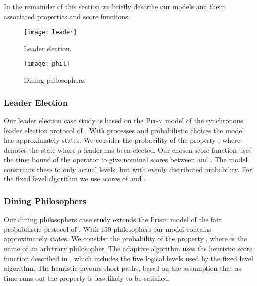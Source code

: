 \documentclass{llncs}
\begin{document}
In the remainder of this section we briefly describe our models and
their associated properties and score functions.

\begin{figure}
\begin{minipage}[t]{0.48\columnwidth}\texttt{[image: leader]}\protect\caption{Leader election.\label{fig:leader}}
\end{minipage}\quad{}\begin{minipage}[t]{0.48\columnwidth}\texttt{[image: phil]}\protect\caption{Dining philosophers.\label{fig:philosophers}}
\end{minipage}
\end{figure}



\subsubsection*{Leader Election}

Our leader election case study is based on the \textsc{Prism} model
of the synchronous leader election protocol of \cite{ItaiRodeh1990}.
With  processes and  probabilistic choices the model
has approximately  states. We consider the probability
of the property , where 
denotes the state where a leader has been elected. Our chosen score
function uses the time bound of the  operator to give
nominal scores between  and . The model constrains these
to only  actual levels, but with evenly distributed probability.
For the fixed level algorithm we use scores of 
and .


\subsubsection*{Dining Philosophers}

Our dining philosophers case study extends the Prism model of the
fair probabilistic protocol of \cite{LehmannRabin1981}. With 150
philosophers our model contains approximately 
states. We consider the probability of the property ,
where  is the name of an arbitrary philosopher. The
adaptive algorithm uses the heuristic score function described in
\cite{JegourelLegaySedwards2014}, which includes the five logical
levels used by the fixed level algorithm. The heuristic favours short
paths, based on the assumption that as time runs out the property
is less likely to be satisfied.
\end{document}
